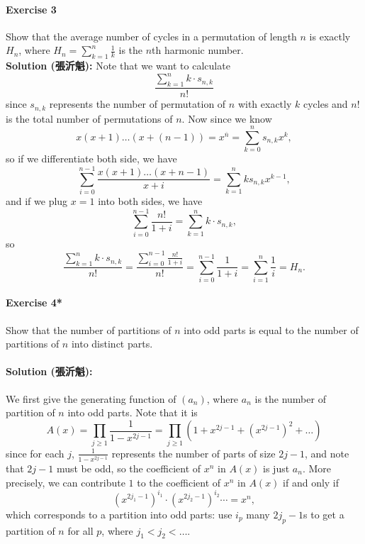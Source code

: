 \documentclass[a4paper,12pt]{article}
\begin{document}
\paragraph{Exercise 3}  Show that the average number of cycles in a permutation of length $n$ is exactly $H_n$, where $H_n = \sum_{k=1}^{n} \frac{1}{k}$ is the $n$th harmonic number. \\
\textbf{Solution (張沂魁):} Note that we want to calculate 
\[
	\frac{\sum_{k=1}^{n} k \cdot s_{n, k} }{n!}
\] since \(s_{n, k}\) represents the number of permutation of \(n\) with exactly \(k\) cycles and \(n!\) is the total number of permutations of \(n\). Now since we know 
\[
	x(x+1)\dots (x+(n-1)) = x^{\overline{n}} = \sum_{k=0}^n s_{n, k} x^k,
\] so if we differentiate both side, we have 
\[
	\sum_{i=0}^{n-1} \frac{x(x+1)\dots (x+n-1)}{x+i} = \sum_{k=1}^n k s_{n, k} x^{k-1},  
\] and if we plug \(x=1\) into both sides, we have 
\[
	\sum_{i=0}^{n-1} \frac{n!}{1+i} = \sum_{k=1}^n k \cdot s_{n, k},  
\] so 
\[
	\frac{\sum_{k=1}^n k \cdot s_{n,k} }{n!} = \frac{\sum_{i=0}^{n-1} \frac{n!}{1+i} }{n!} = \sum_{i=0}^{n-1} \frac{1}{1+i} = \sum_{i=1}^n \frac{1}{i} = H_n.  
\]
\paragraph{Exercise 4*}  Show that the number of partitions of $n$ into odd parts is equal to the number of partitions of $n$ into distinct parts.
\vspace{-1em}
\paragraph{Solution (張沂魁):} We first give the generating function of \((a_n)\), where \(a_n\) is the number of partition of \(n\) into odd parts. Note that it is 
\[
	A(x) = \prod _{j \ge 1} \frac{1}{1 - x^{2j - 1}} = \prod _{j \ge 1} \left( 1 + x^{2j - 1} + \left( x^{2j - 1} \right)^2 + \dots \right) 
\] since for each \(j\), \(\frac{1}{1 - x^{2j - 1}}\) represents the number of parts of size \(2j - 1\), and note that \(2j - 1\) must be odd, so the coefficient of \(x^n\) in \(A(x)\) is just \(a_n\). More precisely, we can contribute \(1\) to the coefficient of \(x^n\) in \(A(x)\) if and only if 
\[
	\left( x^{2 j_1 - 1} \right)^{i_1} \cdot \left( x^{2j_2 - 1} \right)^{i_2} \cdots = x^n,
\] which corresponds to a partition into odd parts: use \(i_p\) many \(2j_p - 1\)s to get a partition of \(n\) for all \(p\), where \(j_1 < j_2 < \dots \).   
\end{document}
